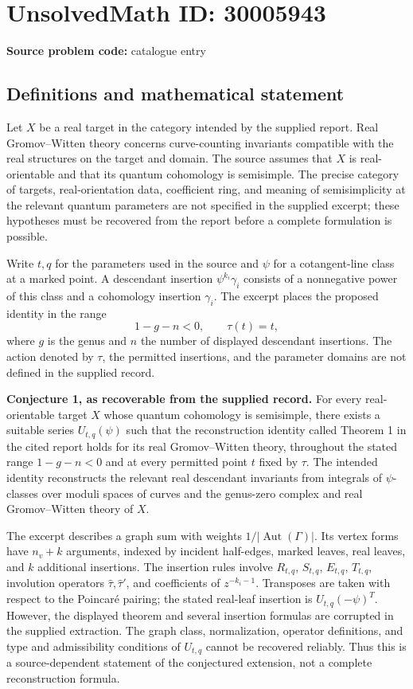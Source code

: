 \documentclass[11pt]{article}
\begin{document}
\section*{UnsolvedMath ID: 30005943}
\textbf{Source problem code:} catalogue entry
\subsection{Definitions and mathematical statement}
Let \(X\) be a real target in the category intended by the supplied report. Real Gromov--Witten theory concerns curve-counting invariants compatible with the real structures on the target and domain. The source assumes that \(X\) is real-orientable and that its quantum cohomology is semisimple. The precise category of targets, real-orientation data, coefficient ring, and meaning of semisimplicity at the relevant quantum parameters are not specified in the supplied excerpt; these hypotheses must be recovered from the report before a complete formulation is possible.

Write \(t,q\) for the parameters used in the source and \(\psi\) for a cotangent-line class at a marked point. A descendant insertion \(\psi^{k_i}\gamma_i\) consists of a nonnegative power of this class and a cohomology insertion \(\gamma_i\). The excerpt places the proposed identity in the range
\[
1-g-n<0,\qquad \tau(t)=t,
\]
where \(g\) is the genus and \(n\) the number of displayed descendant insertions. The action denoted by \(\tau\), the permitted insertions, and the parameter domains are not defined in the supplied record.

\textbf{Conjecture 1, as recoverable from the supplied record.} For every real-orientable target \(X\) whose quantum cohomology is semisimple, there exists a suitable series \(U_{t,q}(\psi)\) such that the reconstruction identity called Theorem 1 in the cited report holds for its real Gromov--Witten theory, throughout the stated range \(1-g-n<0\) and at every permitted point \(t\) fixed by \(\tau\). The intended identity reconstructs the relevant real descendant invariants from integrals of \(\psi\)-classes over moduli spaces of curves and the genus-zero complex and real Gromov--Witten theory of \(X\).

The excerpt describes a graph sum with weights \(1/|\operatorname{Aut}(\Gamma)|\). Its vertex forms have \(n_v+k\) arguments, indexed by incident half-edges, marked leaves, real leaves, and \(k\) additional insertions. The insertion rules involve \(R_{t,q}\), \(S_{t,q}\), \(E_{t,q}\), \(T_{t,q}\), involution operators \(\widehat\tau,\widehat\tau'\), and coefficients of \(z^{-k_i-1}\). Transposes are taken with respect to the Poincar\'e pairing; the stated real-leaf insertion is \(U_{t,q}(-\psi)^T\). However, the displayed theorem and several insertion formulas are corrupted in the supplied extraction. The graph class, normalization, operator definitions, and type and admissibility conditions of \(U_{t,q}\) cannot be recovered reliably. Thus this is a source-dependent statement of the conjectured extension, not a complete reconstruction formula.
\end{document}
